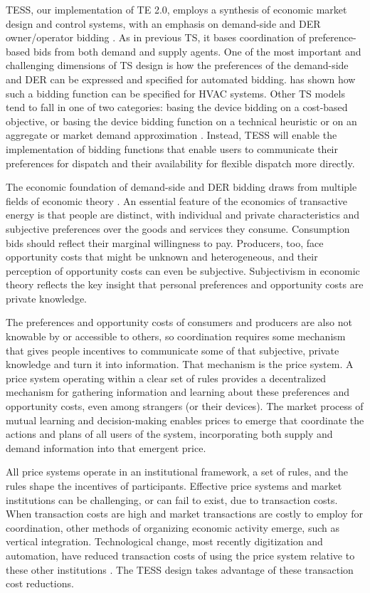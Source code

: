 TESS, our implementation of TE 2.0, employs a synthesis of economic market design and control systems, with an emphasis on demand-side and DER owner/operator bidding \citep{chassin2017thesis}. 
As in previous TS, it bases coordination of preference-based bids from both demand and supply agents. 
One of the most important and challenging dimensions of TS design is how the preferences of the demand-side and DER can be expressed and specified for automated bidding. 
\citet[Chapter IV]{Arlt2020} has shown how such a bidding function can be specified for HVAC systems.
Other TS models tend to fall in one of two categories: basing the device bidding on a cost-based objective, or basing the device bidding function on a technical heuristic or on an aggregate or market demand approximation \citep[Chapter IV]{Arlt2020}. Instead, TESS will enable the implementation of bidding functions that enable users to communicate their preferences for dispatch and their availability for flexible dispatch more directly.

The economic foundation of demand-side and DER bidding draws from multiple fields of economic theory \citep{kiesling_2021}. An essential feature of the economics of transactive energy is that people are distinct, with individual and private characteristics and subjective preferences over the goods and services they consume. Consumption bids should reflect their marginal willingness to pay. Producers, too, face opportunity costs that might be unknown and heterogeneous, and their perception of opportunity costs can even be subjective. Subjectivism in economic theory reflects the key insight that personal preferences and opportunity costs are private knowledge.

The preferences and opportunity costs of consumers and producers are also not knowable by or accessible to others, so coordination requires some mechanism that gives people incentives to communicate some of that subjective, private knowledge and turn it into information. That mechanism is the price system. A price system operating within a clear set of rules provides a decentralized mechanism for gathering information and learning about these preferences and opportunity costs, even among strangers (or their devices). The market process of mutual learning and decision-making enables prices to emerge that coordinate the actions and plans of all users of the system, incorporating both supply and demand information into that emergent price.

All price systems operate in an institutional framework, a set of rules, and the rules shape the incentives of participants. Effective price systems and market institutions can be challenging, or can fail to exist, due to transaction costs. When transaction costs are high and market transactions are costly to employ for coordination, other methods of organizing economic activity emerge, such as vertical integration. Technological change, most recently digitization and automation, have reduced transaction costs of using the price system relative to these other institutions \citep{kiesling_2016}. The TESS design takes advantage of these transaction cost reductions.


